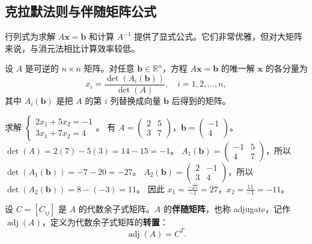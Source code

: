 \subsection{克拉默法则与伴随矩阵公式}

行列式为求解 $A\mathbf{x}=\mathbf{b}$ 和计算 $A^{-1}$ 提供了显式公式。它们非常优雅，但对大矩阵来说，与消元法相比计算效率较低。

\begin{theorem}[克拉默法则]
设 $A$ 是可逆的 $n\times n$ 矩阵。对任意 $\mathbf{b}\in\mathbb{R}^n$，方程 $A\mathbf{x}=\mathbf{b}$ 的唯一解 $\mathbf{x}$ 的各分量为
\[ x_i=\frac{\det(A_i(\mathbf{b}))}{\det(A)},\quad i=1,2,\ldots,n, \]
其中 $A_i(\mathbf{b})$ 是把 $A$ 的第 $i$ 列替换成向量 $\mathbf{b}$ 后得到的矩阵。
\end{theorem}

\begin{example}
求解
$ \begin{cases}2x_1+5x_2=-1\\3x_1+7x_2=4\end{cases}$。
有
$A=\begin{pmatrix}2&5\\3&7\end{pmatrix}$，$\mathbf{b}=\begin{pmatrix}-1\\4\end{pmatrix}$。
$\det(A)=2(7)-5(3)=14-15=-1$。
$A_1(\mathbf{b})=\begin{pmatrix}-1&5\\4&7\end{pmatrix}$，所以 $\det(A_1(\mathbf{b}))=-7-20=-27$。
$A_2(\mathbf{b})=\begin{pmatrix}2&-1\\3&4\end{pmatrix}$，所以 $\det(A_2(\mathbf{b}))=8-(-3)=11$。
因此 $x_1=\frac{-27}{-1}=27$，$x_2=\frac{11}{-1}=-11$。
\end{example}

\begin{definition}[伴随矩阵]
设 $C=[C_{ij}]$ 是 $A$ 的代数余子式矩阵。$A$ 的\textbf{伴随矩阵}，也称 adjugate，记作 $\operatorname{adj}(A)$，定义为代数余子式矩阵的\textbf{转置}：
\[ \operatorname{adj}(A)=C^T. \]
\end{definition}

